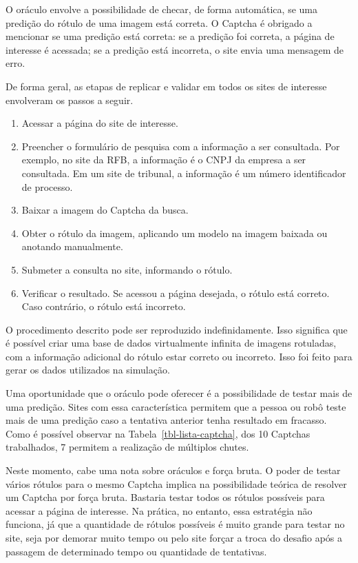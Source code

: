 \documentclass[12pt,twoside,brazilian]{book}
\providecommand{\tightlist}{%
  \setlength{\itemsep}{0pt}\setlength{\parskip}{0pt}}
\begin{document}
O oráculo envolve a possibilidade de checar, de forma automática, se uma
predição do rótulo de uma imagem está correta. O Captcha é obrigado a
mencionar se uma predição está correta: se a predição foi correta, a
página de interesse é acessada; se a predição está incorreta, o site
envia uma mensagem de erro.

De forma geral, as etapas de replicar e validar em todos os sites de
interesse envolveram os passos a seguir.

\begin{enumerate}
\def\labelenumi{\arabic{enumi}.}
\tightlist
\item
  Acessar a página do site de interesse.
\item
  Preencher o formulário de pesquisa com a informação a ser consultada.
  Por exemplo, no site da RFB, a informação é o CNPJ da empresa a ser
  consultada. Em um site de tribunal, a informação é um número
  identificador de processo.
\item
  Baixar a imagem do Captcha da busca.
\item
  Obter o rótulo da imagem, aplicando um modelo na imagem baixada ou
  anotando manualmente.
\item
  Submeter a consulta no site, informando o rótulo.
\item
  Verificar o resultado. Se acessou a página desejada, o rótulo está
  correto. Caso contrário, o rótulo está incorreto.
\end{enumerate}

O procedimento descrito pode ser reproduzido indefinidamente. Isso
significa que é possível criar uma base de dados virtualmente infinita
de imagens rotuladas, com a informação adicional do rótulo estar correto
ou incorreto. Isso foi feito para gerar os dados utilizados na
simulação.

Uma oportunidade que o oráculo pode oferecer é a possibilidade de testar
mais de uma predição. Sites com essa característica permitem que a
pessoa ou robô teste mais de uma predição caso a tentativa anterior
tenha resultado em fracasso. Como é possível observar na
Tabela~\ref{tbl-lista-captcha}, dos 10 Captchas trabalhados, 7 permitem
a realização de múltiplos chutes.

Neste momento, cabe uma nota sobre oráculos e força bruta. O poder de
testar vários rótulos para o mesmo Captcha implica na possibilidade
teórica de resolver um Captcha por força bruta. Bastaria testar todos os
rótulos possíveis para acessar a página de interesse. Na prática, no
entanto, essa estratégia não funciona, já que a quantidade de rótulos
possíveis é muito grande para testar no site, seja por demorar muito
tempo ou pelo site forçar a troca do desafio após a passagem de
determinado tempo ou quantidade de tentativas.
\end{document}
